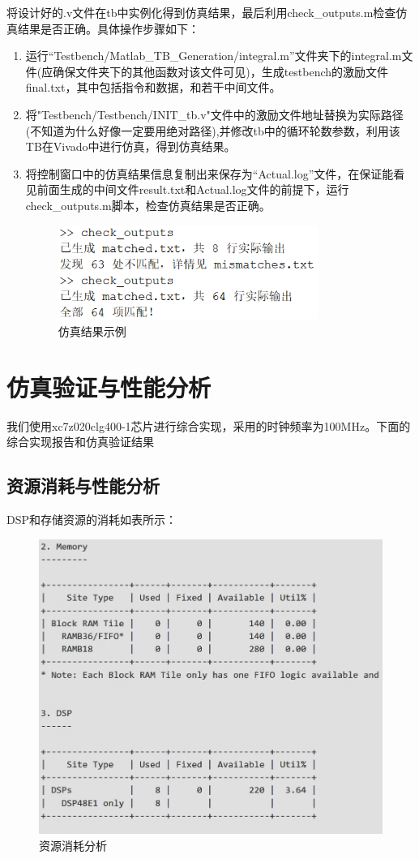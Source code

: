 \documentclass{article}
\begin{document}
将设计好的.v文件在tb中实例化得到仿真结果，最后利用check\_outputs.m检查仿真结果是否正确。具体操作步骤如下：
\begin{enumerate}
    \item 运行``Testbench/Matlab\_TB\_Generation/integral.m''文件夹下的integral.m文件(应确保文件夹下的其他函数对该文件可见)，生成testbench的激励文件final.txt，其中包括指令和数据，和若干中间文件。
    \item 将"Testbench/Testbench/INIT\_tb.v"文件中的激励文件地址替换为实际路径(不知道为什么好像一定要用绝对路径),并修改tb中的循环轮数参数，利用该TB在Vivado中进行仿真，得到仿真结果。
    \item 将控制窗口中的仿真结果信息复制出来保存为``Actual.log''文件，在保证能看见前面生成的中间文件result.txt和Actual.log文件的前提下，运行check\_outputs.m脚本，检查仿真结果是否正确。
    \begin{figure}[!ht]
        \centering
        \includegraphics[width = 0.8\textwidth]{仿真结果示例.png}
        \caption{仿真结果示例}
    \end{figure}
\end{enumerate}
\newpage
\section{仿真验证与性能分析}
我们使用xc7z020clg400-1芯片进行综合实现，采用的时钟频率为100MHz。下面的综合实现报告和仿真验证结果
\subsection{资源消耗与性能分析}
DSP和存储资源的消耗如表所示：
\begin{figure}[!ht]
    \centering
    \includegraphics[width = \textwidth]{Utilization.jpg}
    \caption{资源消耗分析}
\end{figure}
\end{document}
